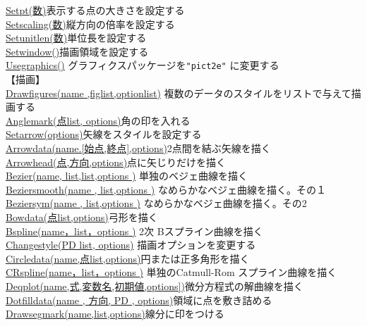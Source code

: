 \documentclass[papersize,a4paper,12pt,uplatex]{jsarticle}
\begin{document}
\begin{tabbing}
\hyperlink{setpt}{Setpt(数)}\>表示する点の大きさを設定する\\
\hyperlink{setscaling}{Setscaling(数)}\>縦方向の倍率を設定する\\
\hyperlink{setunitlen}{Setunitlen(数)}\>単位長を設定する\\
\hyperlink{setwindow}{Setwindow()}\>描画領域を設定する\\
\hyperlink{usegraphics}{Usegraphics()} \>グラフィクスパッケージを\verb|"pict2e"| に変更する\\
【描画】\\
\hyperlink{drawfigures}{Drawfigures(name ,figlist,optionlist)} \>複数のデータのスタイルをリストで与えて描画する\\
\hyperlink{anglemark}{Anglemark(点list, options)}\>角の印を入れる\\
\hyperlink{setarrow}{Setarrow(options)}\>矢線をスタイルを設定する\\
\hyperlink{arrowdata}{Arrowdata(name.[始点,終点],options)}\>2点間を結ぶ矢線を描く\\
\hyperlink{arrowhead}{Arrowhead(点,方向,options)}\>点に矢じりだけを描く\\
\hyperlink{bezier}{Bezier(name, list,list,options )} \>単独のベジェ曲線を描く\\
\hyperlink{beziersmooth}{Beziersmooth(name , list,options )} \>なめらかなベジェ曲線を描く。その１\\
\hyperlink{beziersym}{Beziersym(name , list,options )} \>なめらかなベジェ曲線を描く。その2\\
\hyperlink{bowdata}{Bowdata(点list,options)}\>弓形を描く\\
\hyperlink{bspline}{Bspline(name，list，options )} \>2次 Bスプライン曲線を描く\\
\hyperlink{changestyle}{Changestyle(PD list, options)} \>描画オプションを変更する\\
\hyperlink{circledata}{Circledata(name,点list,options)}\>円または正多角形を描く\\
\hyperlink{crspline}{CRspline(name，list，options )} \>単独のCatmull-Rom スプライン曲線を描く\\
\hyperlink{deqplot}{Deqplot(name,式,変数名,初期値,options])}\>微分方程式の解曲線を描く\\
\hyperlink{dotfilldata}{Dotfilldata(name , 方向, PD , options)}\>領域に点を敷き詰める\\
\hyperlink{drawsegmark}{Drawsegmark(name,list,options)}\>線分に印をつける\\

\end{tabbing}
\end{document}
